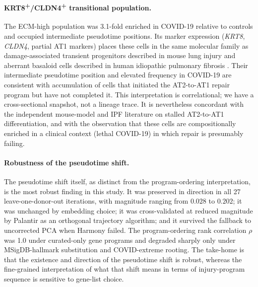 \documentclass[11pt]{article}
\begin{document}
\paragraph{KRT8\textsuperscript{+}/CLDN4\textsuperscript{+} transitional population.} The ECM-high population was 3.1-fold enriched in COVID-19 relative to controls and occupied intermediate pseudotime positions. Its marker expression (\textit{KRT8}, \textit{CLDN4}, partial AT1 markers) places these cells in the same molecular family as damage-associated transient progenitors described in mouse lung injury \citep{Kobayashi2020, Strunz2020} and aberrant basaloid cells described in human idiopathic pulmonary fibrosis \citep{Adams2020, Habermann2020}. Their intermediate pseudotime position and elevated frequency in COVID-19 are consistent with accumulation of cells that initiated the AT2-to-AT1 repair program but have not completed it. This interpretation is correlational; we have a cross-sectional snapshot, not a lineage trace. It is nevertheless concordant with the independent mouse-model and IPF literature on stalled AT2-to-AT1 differentiation, and with the observation that these cells are compositionally enriched in a clinical context (lethal COVID-19) in which repair is presumably failing.

\paragraph{Robustness of the pseudotime shift.} The pseudotime shift itself, as distinct from the program-ordering interpretation, is the most robust finding in this study. It was preserved in direction in all 27 leave-one-donor-out iterations, with magnitude ranging from $0.028$ to $0.202$; it was unchanged by embedding choice; it was cross-validated at reduced magnitude by Palantir as an orthogonal trajectory algorithm; and it survived the fallback to uncorrected PCA when Harmony failed. The program-ordering rank correlation $\rho$ was 1.0 under curated-only gene programs and degraded sharply only under MSigDB-hallmark substitution and COVID-extreme rooting. The take-home is that the existence and direction of the pseudotime shift is robust, whereas the fine-grained interpretation of what that shift means in terms of injury-program sequence is sensitive to gene-list choice.
\end{document}
